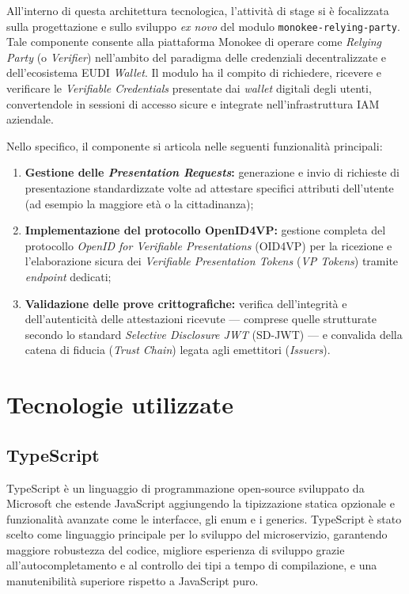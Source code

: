 All'interno di questa architettura tecnologica, l'attività di stage si è focalizzata sulla progettazione e sullo sviluppo \emph{ex novo} del modulo \texttt{monokee-\allowbreak{}relying-\allowbreak{}party}. Tale componente consente alla piattaforma Monokee di operare come \emph{Relying Party\glsfirstoccur{}} (o \emph{Verifier\glsfirstoccur{}}) nell'ambito del paradigma delle credenziali decentralizzate e dell'ecosistema EUDI \textit{Wallet}. Il modulo ha il compito di richiedere, ricevere e verificare le \emph{Verifiable Credentials} presentate dai \emph{wallet} digitali degli utenti, convertendole in sessioni di accesso sicure e integrate nell'infrastruttura IAM aziendale.

Nello specifico, il componente si articola nelle seguenti funzionalità principali:
\begin{enumerate}
    \item \textbf{Gestione delle \emph{Presentation Requests}:} generazione e invio di richieste di presentazione standardizzate volte ad attestare specifici attributi dell'utente (ad esempio la maggiore età o la cittadinanza);
    \item \textbf{Implementazione del protocollo OpenID4VP:} gestione completa del protocollo \emph{OpenID for Verifiable Presentations} (OID4VP\glsfirstoccur{}) per la ricezione e l'elaborazione sicura dei \emph{Verifiable Presentation Tokens} (\emph{VP Tokens}\glsfirstoccur{}) tramite \emph{endpoint} dedicati;
    \item \textbf{Validazione delle prove crittografiche:} verifica dell'integrità e dell'autenticità delle attestazioni ricevute — comprese quelle strutturate secondo lo standard \emph{Selective Disclosure JWT\glsfirstoccur{}} (SD-JWT\glsfirstoccur{}) — e convalida della catena di fiducia (\emph{Trust Chain\glsfirstoccur{}}) legata agli emettitori (\emph{Issuers}).
\end{enumerate}

\section{Tecnologie utilizzate}
\subsection{TypeScript}

TypeScript è un linguaggio di programmazione open-source sviluppato da Microsoft che estende JavaScript aggiungendo la tipizzazione statica opzionale e funzionalità avanzate come le interfacce, gli enum e i generics. TypeScript è stato scelto come linguaggio principale per lo sviluppo del microservizio, garantendo maggiore robustezza del codice, migliore esperienza di sviluppo grazie all'autocompletamento e al controllo dei tipi a tempo di compilazione, e una manutenibilità superiore rispetto a JavaScript puro.

